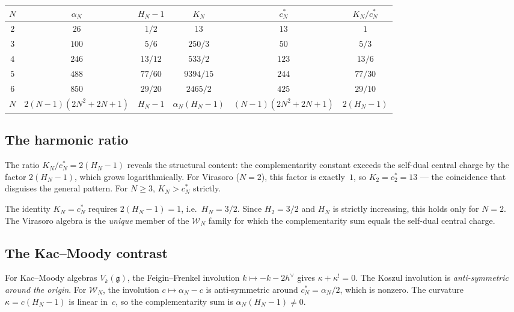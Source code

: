 \documentclass[11pt]{article}
\newcommand{\cW}{\mathcal{W}}
\newcommand{\fg}{\mathfrak{g}}
\begin{document}
\begin{center}
\renewcommand{\arraystretch}{1.3}
\begin{tabular}{cccccc}
\toprule
$N$ & $\alpha_N$ & $H_N - 1$ & $K_N$ & $c^*_N$ & $K_N / c^*_N$ \\
\midrule
$2$ & $26$ & $1/2$ & $13$ & $13$ & $1$ \\
$3$ & $100$ & $5/6$ & $250/3$ & $50$ & $5/3$ \\
$4$ & $246$ & $13/12$ & $533/2$ & $123$ & $13/6$ \\
$5$ & $488$ & $77/60$ & $9394/15$ & $244$ & $77/30$ \\
$6$ & $850$ & $29/20$ & $2465/2$ & $425$ & $29/10$ \\
\midrule
$N$ & $2(N{-}1)(2N^2{+}2N{+}1)$ & $H_N - 1$
  & $\alpha_N(H_N - 1)$ & $(N{-}1)(2N^2{+}2N{+}1)$
  & $2(H_N - 1)$ \\
\bottomrule
\end{tabular}
\end{center}

\subsection*{The harmonic ratio}

The ratio $K_N / c^*_N = 2(H_N - 1)$ reveals the structural content:
the complementarity constant exceeds the self-dual central charge
by the factor $2(H_N - 1)$, which grows logarithmically.
For Virasoro ($N=2$), this factor is exactly~$1$, so $K_2 = c^*_2 = 13$
--- the coincidence that disguises the general pattern.
For $N \ge 3$, $K_N > c^*_N$ strictly.

\begin{observation}[Why $K_N = c^*_N$ only for Virasoro]
The identity $K_N = c^*_N$ requires $2(H_N - 1) = 1$, i.e.\
$H_N = 3/2$.  Since $H_2 = 3/2$ and $H_N$ is strictly
increasing, this holds only for $N = 2$.  The Virasoro algebra
is the \emph{unique} member of the $\cW_N$ family for which the
complementarity sum equals the self-dual central charge.
\end{observation}

\subsection*{The Kac--Moody contrast}

For Kac--Moody algebras $V_k(\fg)$, the Feigin--Frenkel involution
$k \mapsto -k - 2h^\vee$ gives $\kappa + \kappa^! = 0$.
The Koszul involution is \emph{anti-symmetric around the origin}.
For $\cW_N$, the involution $c \mapsto \alpha_N - c$ is
anti-symmetric around $c^*_N = \alpha_N/2$, which is nonzero.
The curvature $\kappa = c(H_N - 1)$ is linear in~$c$, so the
complementarity sum is $\alpha_N(H_N - 1) \ne 0$.
\end{document}
